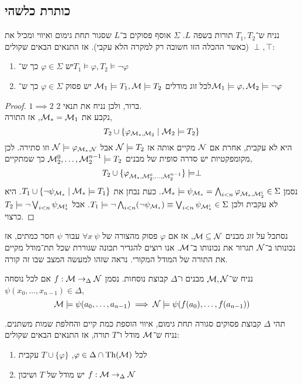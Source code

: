 \subsection{כותרת כלשהי}
\begin{lemma}[הפרדה]
	נניח ש־$T_1, T_2$ תורות בשפה $L$.
	$\Sigma$ אוסף פסוקים ב־$L$ שסגור תחת גימום ואיווי ומכיל את $\perp, \top$ (כאשר ההכלה הזו חשובה רק למקרה הלא עקבי).
	אז התנאים הבאים שקולים:
	\begin{enumerate}
		\item יש $\varphi \in \Sigma$ כך ש־$T_1 \models \varphi, T_2 \models \lnot \varphi$
		\item לכל זוג מודלים $\mathcal{M}_1 \models T_1, \mathcal{M} \models T_2$ יש פסוק $\varphi \in \Sigma$ כך ש־$\mathcal{M}_1 \models \varphi, \mathcal{M}_2 \models \lnot \varphi$
	\end{enumerate}
\end{lemma}
\begin{proof}
	$1 \implies 2$ ברור, ולכן נניח את תנאי 2. \\
	נקבע את $\mathcal{M}_* = \mathcal{M}_1$, אז התורה,
	\[
		T_2 \cup \{ \varphi_{\mathcal{M}_*, \mathcal{M}_2} \mid \mathcal{M}_2 \models T_2 \}
	\]
	היא לא עקבית, אחרת אם $\mathcal{N}$ מקיים אותה אז $\mathcal{N} \models T_2$ אבל $\mathcal{N} \models \varphi_{\mathcal{M}_*, \mathcal{N}}$ וזו סתירה.
	לכן מקומפקטיות יש סדרה סופית של מבנים $\mathcal{M}_2^0, \ldots, \mathcal{M}_2^{n - 1} \models T_2$ כך שמתקיים,
	\[
		T_2 \cup \{ \varphi_{\mathcal{M}_*, \mathcal{M}_2^0, \ldots, \mathcal{M}_2^{n - 1}} \} \models \perp
	\]
	נסמן $\mathcal{M}_* \models \psi_{\mathcal{M}_*} = \bigwedge_{i < n} \varphi_{\mathcal{M}_*, \mathcal{M}_2^i} \in \Sigma$.
	כעת נבחן את $T_1 \cup \{ \lnot \psi_{\mathcal{M}_*} \mid \mathcal{M}_* \models T_1 \}$.
	היא לא עקבית ולכן $T_1 \models \lnot \bigwedge_{i < n} (\lnot \psi_{\mathcal{M}_*}) \equiv \bigvee_{i < n} \psi_{\mathcal{M}_*^i} \in \Sigma$.
	אבל $T_2 \models \lnot \bigvee_{i < n} \psi_{\mathcal{M}_*^1}$ כרצוי.
\end{proof}
נסתכל על זוג מבנים $\mathcal{M} \subseteq \mathcal{N}$, אז אם $\varphi$ פסוק מהצורה של $\forall x\ \psi$ עבור $\psi$ חסר כמתים, אז נכונותו ב־$\mathcal{N}$ תגרור את נכונותו ב־$\mathcal{M}$.
אנו רוצים להגדיר תכונה שגוררת שכל תת־מודל מקיים את התורה של המודל המקורי.
נראה שזהו למעשה המצב שבו זה קורה.
\begin{notation}
	נניח ש־$\mathcal{M}, \mathcal{N}$ מבנים ו־$\Delta$ קבוצת נוסחות.
	נסמן $f : \mathcal{M} \to_{\Delta} \mathcal{N}$ אם לכל נוסחה $\psi(x_0, \ldots, x_{n - 1}) \in \Delta$,
	\[
		\mathcal{M} \models \psi(a_0, \ldots, a_{n - 1})
		\implies \mathcal{N} \models \psi(f(a_0), \ldots, f(a_{n - 1}))
	\]
\end{notation}
\begin{lemma}
	תהי $\Delta$ קבוצת פסוקים סגורה תחת גימום, איווי הוספת כמת קיים והחלפת שמות משתנים.
	נניח ש־$\mathcal{M}$ מודל ו־$T$ תורה, אז התנאים הבאים שקולים:
	\begin{enumerate}
		\item לכל $\varphi \in \Delta \cap \operatorname{Th}(\mathcal{M})$, $T \cup \{ \varphi \}$ עקבית
		\item יש מודל של $T$ ושיכון $f : \mathcal{M} \to_{\Delta} \mathcal{N}$
	\end{enumerate}
\end{lemma}
